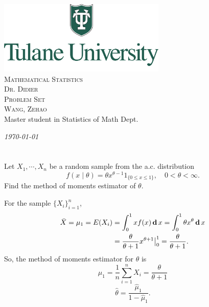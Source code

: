 \documentclass[12pt]{article}
\newcommand{\CN}{Mathematical Statistics}
\newcommand{\Ti}{Problem Set}
\newcommand{\Pf}{Dr. Didier}
\newcommand{\FN}{Zehao}
\newcommand{\LN}{Wang}
\begin{document}
\begin{titlepage}
    \begin{center}    
    \includegraphics[width=0.6\textwidth]{Tulane.png}\\[1cm]    
    
    \textsc{\Huge \CN}\\[0.5cm]
    \textsc{\large \Pf}\\[1.0cm]
    
    \textsc{\LARGE \Ti}\\[0.5cm]
    \textsc{\large \LN, \FN}\\
    {Master student in Statistics of Math Dept.}
    
    
    \vfill
    
    {\Large \emph{\today}}
    
    \end{center}
\end{titlepage}
    
    \section{}

    \begin{exercise}
        Let \(X_{1}, \cdots, X_{n}\) be a random sample from the a.c. distribution
        \[
        f(x \mid \theta)=\theta x^{\theta-1} 1_{\{0 \leqslant x \leqslant 1\}}, \quad 0<\theta<\infty .
        \]
        Find the method of moments estimator of \(\theta\).
    \end{exercise}

    \begin{solution}
        For the sample \(\{X_i\}_{i=1}^n\), 
        \[
            \begin{aligned}
                \bar{X}=\mu_1=E(X_i)&=\int_0^1xf(x)\,\mathbf{d}\, x=\int_0^1\theta x^\theta\,\mathbf{d}\, x\\
                &=\frac{\theta}{\theta+1}x^{\theta+1}\big|_0^1=\frac{\theta}{\theta+1}. 
            \end{aligned}
        \]
        So, the method of moments estimator for $\theta$ is 
        \[
            \hat{\mu}_1=\frac{1}{n}\sum_{i=1}^nX_i=\frac{\theta}{\theta+1}
        \]
        \[
            \hat{\theta}=\frac{\hat{\mu}_1}{1-\hat{\mu}_1}. 
        \]
    \end{solution}
\end{document}
